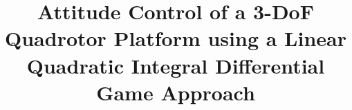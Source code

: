 \documentclass[3p]{elsarticle}
\begin{document}
\begin{frontmatter}



\title{Attitude Control of a 3-DoF Quadrotor Platform using a Linear Quadratic Integral Differential Game Approach}








\end{frontmatter}
\end{document}
